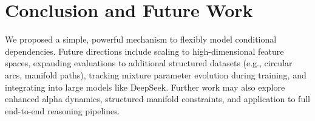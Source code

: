\documentclass[11pt]{article}
\begin{document}
\section{Conclusion and Future Work}
We proposed a simple, powerful mechanism to flexibly model conditional dependencies. Future directions include scaling to high-dimensional feature spaces, expanding evaluations to additional structured datasets (e.g., circular arcs, manifold paths), tracking mixture parameter evolution during training, and integrating into large models like DeepSeek. Further work may also explore enhanced alpha dynamics, structured manifold constraints, and application to full end-to-end reasoning pipelines.



\end{document}
